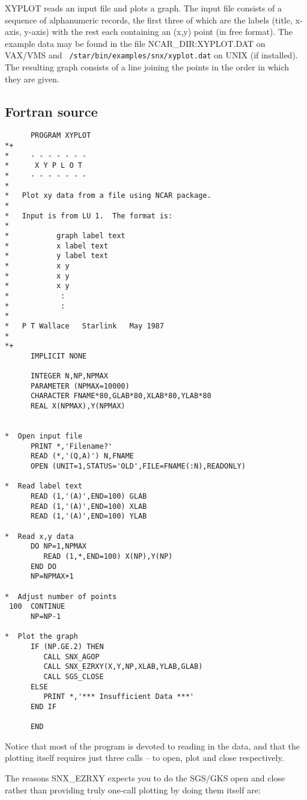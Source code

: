 \sloppypar
XYPLOT reads an input file and plots a graph.  The input file consists
of a sequence of alphanumeric records, the first three of which are the
labels (title, x-axis, y-axis) with the rest each containing an (x,y)
point (in free format).  The example data may be found in the file
NCAR\_DIR:XYPLOT.DAT on VAX/VMS and {\tt
/star/\-bin/\-examples/\-snx/xyplot.dat} on UNIX (if installed).  The
resulting graph consists of a line joining the points in the order in
which they are given.

\subsection {Fortran source}

\small
\begin{verbatim}
      PROGRAM XYPLOT
*+
*     - - - - - - -
*      X Y P L O T
*     - - - - - - -
*
*   Plot xy data from a file using NCAR package.
*
*   Input is from LU 1.  The format is:
*
*           graph label text
*           x label text
*           y label text
*           x y
*           x y
*           x y
*            :
*            :
*
*   P T Wallace   Starlink   May 1987
*
*+
      IMPLICIT NONE

      INTEGER N,NP,NPMAX
      PARAMETER (NPMAX=10000)
      CHARACTER FNAME*80,GLAB*80,XLAB*80,YLAB*80
      REAL X(NPMAX),Y(NPMAX)


*  Open input file
      PRINT *,'Filename?'
      READ (*,'(Q,A)') N,FNAME
      OPEN (UNIT=1,STATUS='OLD',FILE=FNAME(:N),READONLY)

*  Read label text
      READ (1,'(A)',END=100) GLAB
      READ (1,'(A)',END=100) XLAB
      READ (1,'(A)',END=100) YLAB

*  Read x,y data
      DO NP=1,NPMAX
         READ (1,*,END=100) X(NP),Y(NP)
      END DO
      NP=NPMAX+1

*  Adjust number of points
 100  CONTINUE
      NP=NP-1

*  Plot the graph
      IF (NP.GE.2) THEN
         CALL SNX_AGOP
         CALL SNX_EZRXY(X,Y,NP,XLAB,YLAB,GLAB)
         CALL SGS_CLOSE
      ELSE
         PRINT *,'*** Insufficient Data ***'
      END IF

      END
\end{verbatim}
\normalsize

Notice that most of the program is devoted to reading in the data, and that
the plotting itself requires just three calls -- to open, plot and close
respectively.

The reasons SNX\_EZRXY expects you to do the SGS/GKS open and close rather
than providing truly one-call plotting by doing them itself are:

